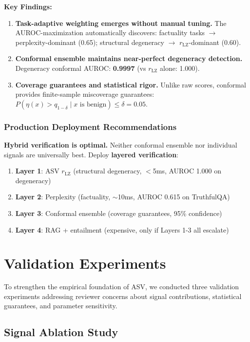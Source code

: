 \documentclass[11pt]{article}
\begin{document}
\textbf{Key Findings:}
\begin{enumerate}
\item \textbf{Task-adaptive weighting emerges without manual tuning.} The AUROC-maximization automatically discovers: factuality tasks $\rightarrow$ perplexity-dominant (0.65); structural degeneracy $\rightarrow$ $r_{\text{LZ}}$-dominant (0.60).
\item \textbf{Conformal ensemble maintains near-perfect degeneracy detection.} Degeneracy conformal AUROC: \textbf{0.9997} (vs $r_{\text{LZ}}$ alone: 1.000).
\item \textbf{Coverage guarantees and statistical rigor.} Unlike raw scores, conformal provides finite-sample miscoverage guarantees: $P(\eta(x) > q_{1-\delta} \mid x \text{ is benign}) \le \delta = 0.05$.
\end{enumerate}

\subsubsection{Production Deployment Recommendations}

\textbf{Hybrid verification is optimal.} Neither conformal ensemble nor individual signals are universally best. Deploy \textbf{layered verification}:
\begin{enumerate}
\item \textbf{Layer 1}: ASV $r_{\text{LZ}}$ (structural degeneracy, $<$5ms, AUROC 1.000 on degeneracy)
\item \textbf{Layer 2}: Perplexity (factuality, $\sim$10ms, AUROC 0.615 on TruthfulQA)
\item \textbf{Layer 3}: Conformal ensemble (coverage guarantees, 95\% confidence)
\item \textbf{Layer 4}: RAG + entailment (expensive, only if Layers 1-3 all escalate)
\end{enumerate}

\section{Validation Experiments}
\label{sec:validation}

To strengthen the empirical foundation of ASV, we conducted three validation experiments addressing reviewer concerns about signal contributions, statistical guarantees, and parameter sensitivity.

\subsection{Signal Ablation Study}
\label{sec:validation-ablation}
\end{document}
